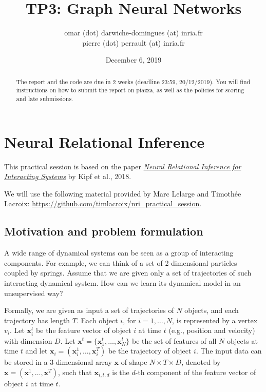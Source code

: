 \documentclass{article}
\begin{document}
	\title{TP3: Graph Neural Networks}
	\author{omar (dot) darwiche-domingues (at) inria.fr \\
			pierre (dot) perrault (at) inria.fr}
	\date{December 6, 2019}
	\maketitle

	\begin{abstract}
		The report and the code are due in 2 weeks (deadline 23:59, 20/12/2019).
		You will find instructions on how to submit the report on piazza,
		as well as the policies for scoring and late submissions.
	\end{abstract}

\section{Neural Relational Inference}

This practical session is based on the paper \href{https://arxiv.org/pdf/1802.04687.pdf}{\emph{Neural Relational Inference for Interacting Systems}} by Kipf et al., 2018.

We will use the following material provided by Marc Lelarge and Timoth\'ee Lacroix: \url{https://github.com/timlacroix/nri_practical_session}. 

\subsection{Motivation and problem formulation}
A wide range of dynamical systems can be seen as a group of interacting components. For example, we can think of a set of 2-dimensional particles coupled by springs. Assume that we are given only a set of trajectories of such interacting dynamical system. How can we learn its dynamical model in an unsupervised way?

Formally, we are given as input a set of trajectories of $N$ objects, and each trajectory has length $T$. Each object $i$, for $i=1,\ldots, N$, is represented by a vertex $v_i$. Let $\mathbf{x}_i^t$ be the feature vector of object $i$ at time $t$ (e.g., position and velocity) with dimension $D$. Let $\mathbf{x}^t = \{\mathbf{x}_1^t, \ldots, \mathbf{x}_N^t\}$ be the set of features of all $N$ objects at time $t$ and let $\mathbf{x}_i = (\mathbf{x}_i^1, \ldots, \mathbf{x}_i^T)$ be the trajectory of object $i$. The input data can be stored in a 3-dimensional array $\mathbf{x}$ of shape $N\times T \times D$, denoted by $\mathbf{x} = (\mathbf{x}^1, \ldots, \mathbf{x}^T)$, such that $\mathbf{x}_{i,t,d}$ is the $d$-th component of the feature vector of object $i$ at time $t$. 
\end{document}

